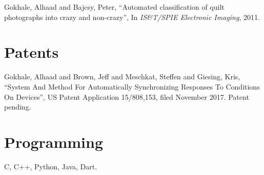 \documentclass[margin,line]{resume}
\begin{document}
\begin{resume}
\vspace{-2mm}
    Gokhale, Alhaad and Bajcsy, Peter,
    ``Automated classification of quilt photographs into crazy and non-crazy'',
    In \textsl{IS\&T/SPIE Electronic Imaging}, 2011.
    
    \section{\mysidestyle Patents}

    Gokhale, Alhaad and Brown, Jeff and Meschkat, Steffen and Giesing, Kris, 
    ``System And Method For Automatically Synchronizing Responses To Conditions On Devices'',
    US Patent Application 15/808,153, filed November 2017. Patent pending.

    \section{\mysidestyle Programming} 

    C, C++, Python, Java, Dart.


\end{resume}
\end{document}
